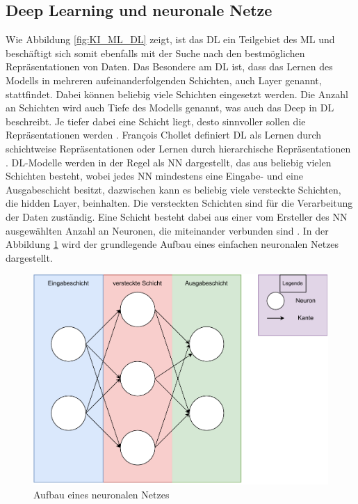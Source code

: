 \subsection{Deep Learning und neuronale Netze}
Wie Abbildung \ref*{fig:KI_ML_DL} zeigt, ist das \ac{DL} ein Teilgebiet des \ac{ML} und beschäftigt sich somit ebenfalls mit der Suche nach den bestmöglichen Repräsentationen von
Daten. Das Besondere am \ac{DL} ist, dass das Lernen des Modells in mehreren aufeinanderfolgenden Schichten, auch Layer genannt, stattfindet. Dabei können
beliebig viele Schichten eingesetzt werden. Die Anzahl an Schichten wird auch Tiefe des Modells genannt, was auch das \glqq Deep\grqq{} in \ac{DL} beschreibt. Je tiefer dabei eine Schicht liegt,
desto sinnvoller sollen die Repräsentationen werden \cite[vgl. S.27]{DL_PY}. François Chollet definiert \ac{DL} als \glqq Lernen durch schichtweise Repräsentationen oder 
Lernen durch hierarchische Repräsentationen\grqq{} \cite[S.27]{DL_PY}. \ac{DL}-Modelle werden in der Regel als \ac{NN} dargestellt, das aus beliebig vielen Schichten besteht, wobei
jedes \ac{NN} mindestens eine Eingabe- und eine Ausgabeschicht  besitzt, dazwischen kann es beliebig viele versteckte Schichten, die hidden Layer, beinhalten. 
Die versteckten Schichten sind für die Verarbeitung der Daten zuständig. Eine Schicht besteht dabei aus einer vom Ersteller des \ac{NN} ausgewählten Anzahl an Neuronen, die miteinander 
verbunden sind \cite[vgl. S.26]{NN}. In der Abbildung \ref*{fig:NN_Modell} wird der grundlegende Aufbau eines einfachen neuronalen Netzes dargestellt. 

\begin{figure}[H]
    \centering
    \includegraphics[scale=0.7]{abbildungen/NN_Modell.pdf}
    \caption{Aufbau eines neuronalen Netzes \cite[S.27]{NN}}
    \label{fig:NN_Modell}
\end{figure}

